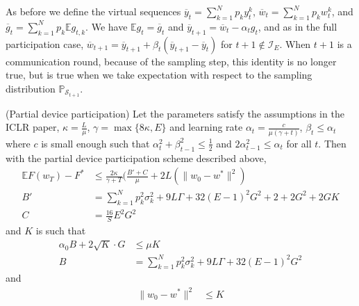 As before we define the virtual sequences $\overline{y}_{t}=\sum_{k=1}^{N}p_{k}y_{t}^{k}$,
$\overline{w}_{t}=\sum_{k=1}^{N}p_{k}w_{t}^{k}$, and $\overline{g}_{t}=\sum_{k=1}^{N}p_{k}\mathbb{E}g_{t,k}$.
We have $\mathbb{E}g_{t}=\overline{g}_{t}$ and $\overline{y}_{t+1}=\overline{w}_{t}-\alpha_{t}g_{t}$,
and as in the full participation case, $\overline{w}_{t+1}=\overline{y}_{t+1}+\beta_{t}(\overline{y}_{t+1}-\overline{y}_{t})$
for $t+1\notin\mathcal{I}_{E}$. When $t+1$ is a communication round,
because of the sampling step, this identity is no longer true, but
is true when we take expectation with respect to the sampling distribution
$\mathbb{P}_{\mathcal{S}_{t+1}}$. 
\begin{theorem}
	(Partial device participation) Let the parameters satisfy the assumptions
	in the ICLR paper, $\kappa=\frac{L}{\mu}$, $\gamma=\max\{8\kappa,E\}$
	and learning rate $\alpha_{t}=\frac{c}{\mu(\gamma+t)}$, $\beta_{t}\leq\alpha_{t}$
	where $c$ is small enough such that $\alpha_{t}^{2}+\beta_{t-1}^{2}\leq\frac{1}{2}$
	and $2\alpha_{t-1}^{2}\leq\alpha_{t}$ for all $t$. Then with the
	partial device participation scheme described above,
	\begin{align*}
	\mathbb{E}F(w_{T})-F^{\ast} & \leq\frac{2\kappa}{\gamma+T}(\frac{B'+C}{\mu}+2L(\|w_{0}-w^{\ast}\|^{2})\\
	B' & =\sum_{k=1}^{N}p_{k}^{2}\sigma_{k}^{2}+9L\Gamma+32(E-1)^{2}G^{2}+2+2G^{2}+2GK\\
	C & =\frac{16}{S}E^{2}G^{2}
	\end{align*}
	and $K$ is such that 
	\begin{align*}
	\alpha_{0}B+2\sqrt{K}\cdot G & \leq\mu K\\
	B & =\sum_{k=1}^{N}p_{k}^{2}\sigma_{k}^{2}+9L\Gamma+32(E-1)^{2}G^{2}
	\end{align*}
	and
	\begin{align*}
	\|w_{0}-w^{\ast}\|^{2} & \leq K
	\end{align*}
\end{theorem}
%
